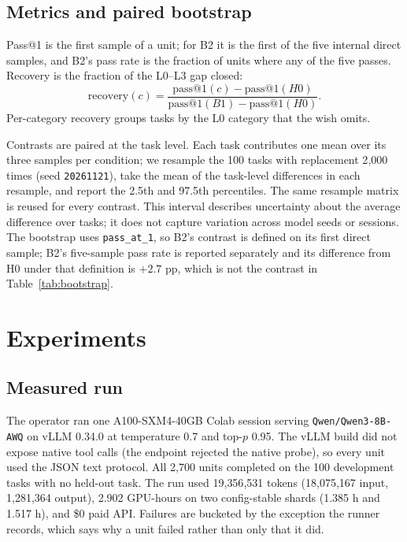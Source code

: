 \documentclass{article}
\begin{document}
\subsection{Metrics and paired bootstrap}

Pass@1 is the first sample of a unit; for B2 it is the first of the five internal direct
samples, and B2's pass rate is the fraction of units where any of the five passes. Recovery is
the fraction of the L0--L3 gap closed:
\[
  \mathrm{recovery}(c) = \frac{\mathrm{pass@1}(c) - \mathrm{pass@1}(H0)}
                                {\mathrm{pass@1}(B1) - \mathrm{pass@1}(H0)}.
\]
Per-category recovery groups tasks by the L0 category that the wish omits.

Contrasts are paired at the task level. Each task contributes one mean over its three samples
per condition; we resample the 100 tasks with replacement 2{,}000 times (seed
\texttt{20261121}), take the mean of the task-level differences in each resample, and report
the 2.5th and 97.5th percentiles. The same resample matrix is reused for every contrast. This
interval describes uncertainty about the average difference over tasks; it does not capture
variation across model seeds or sessions. The bootstrap uses \texttt{pass\_at\_1}, so B2's
contrast is defined on its first direct sample; B2's five-sample pass rate is reported
separately and its difference from H0 under that definition is $+2.7$ pp, which is not the
contrast in Table~\ref{tab:bootstrap}.

\section{Experiments}
\label{sec:experiments}

\subsection{Measured run}

The operator ran one A100-SXM4-40GB Colab session serving \texttt{Qwen/Qwen3-8B-AWQ} on vLLM
0.34.0 at temperature 0.7 and top-$p$ 0.95. The vLLM build did not expose native tool calls
(the endpoint rejected the native probe), so every unit used the JSON text protocol. All
2{,}700 units completed on the 100 development tasks with no held-out task. The run used
19{,}356{,}531 tokens (18{,}075{,}167 input, 1{,}281{,}364 output), 2.902 GPU-hours on two
config-stable shards (1.385 h and 1.517 h), and \$0 paid API. Failures are bucketed by the
exception the runner records, which says why a unit failed rather than only that it did.
\end{document}
